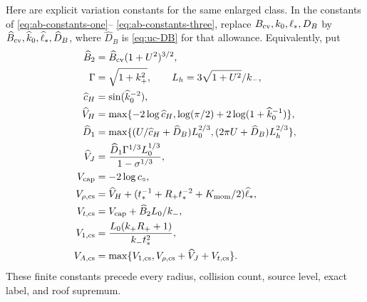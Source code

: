 Here are explicit variation constants for the same enlarged class.
In the constants of \eqref{eq:ab-constants-one}--
\eqref{eq:ab-constants-three}, replace
$B_{\rm cv},k_0,\ell_*,D_B$ by
$\widehat B_{\rm cv},\widehat k_0,\widehat\ell_*,\widehat D_B$,
where $\widehat D_B$ is \eqref{eq:uc-DB} for that allowance.
Equivalently, put
\begin{align}
 \widehat B_2&=\widehat B_{\rm cv}(1+U^2)^{3/2},\notag\\
 \Gamma&=\sqrt{1+k_+^2},\qquad
 L_h=3\sqrt{1+U^2}/k_-,\notag\\
 \widehat c_H&=\sin(\widehat k_0^{-2}),\notag\\
 \widehat V_H&=\max\{-2\log\widehat c_H,
        \log(\pi/2)+2\log(1+\widehat k_0^{-1})\},\notag\\
 \widehat D_1&=\max\{(U/\widehat c_H+\widehat D_B)L_0^{2/3},
                   (2\pi U+\widehat D_B)L_h^{2/3}\},\notag\\
 \widehat V_J&=\frac{\widehat D_1\Gamma^{1/3}L_0^{1/3}}
                         {1-\sigma^{1/3}},\notag\\
 V_{\rm cap}&=-2\log c_\circ,\notag\\
 V_{\rho,\rm cs}&=\widehat V_H+
       (t_*^{-1}+R_+t_*^{-2}+K_{\rm mom}/2)\widehat\ell_*,\notag\\
 V_{t,\rm cs}&=V_{\rm cap}+\widehat B_2L_0/k_-,\notag\\
 V_{1,\rm cs}&=\frac{L_0(k_+R_++1)}{k_-t_*^2},\notag\\
 V_{A,\rm cs}&=\max\{V_{1,\rm cs},
                  V_{\rho,\rm cs}+\widehat V_J+V_{t,\rm cs}\}.
                                                        \label{eq:cs-variation-constants}
\end{align}
These finite constants precede every radius, collision count,
source level, exact label, and roof supremum.

